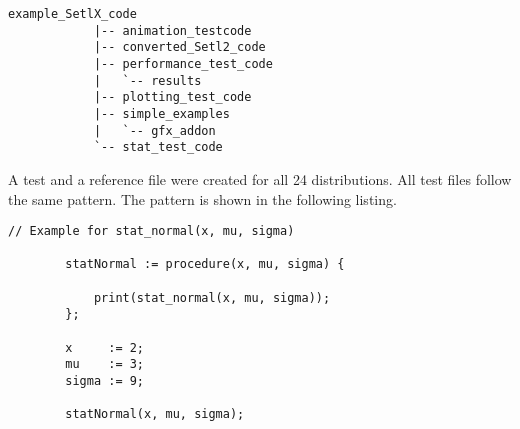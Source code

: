 	\begin{center}
		\begin{lstlisting}[caption=Folder Structure example\_SetlX\_code, label=lis:structureExample]
			example_SetlX_code
			|-- animation_testcode
			|-- converted_Setl2_code
			|-- performance_test_code
			|   `-- results
			|-- plotting_test_code
			|-- simple_examples
			|   `-- gfx_addon
			`-- stat_test_code
		\end{lstlisting}
	\end{center}

	A test and a reference file were created for all 24 distributions. All test files follow the same pattern. The pattern is shown in the following listing.

	\begin{center}
		\begin{lstlisting}[caption=Test File Example, language=setlx, label=lis:exampleCode]
		// Example for stat_normal(x, mu, sigma)

		statNormal := procedure(x, mu, sigma) {

			print(stat_normal(x, mu, sigma));
		};

		x     := 2;
		mu	  := 3;
		sigma := 9;

		statNormal(x, mu, sigma);
		\end{lstlisting}
	\end{center}

